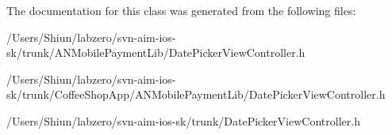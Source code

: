 The documentation for this class was generated from the following files:\begin{DoxyCompactItemize}
\item 
/Users/Shiun/labzero/svn-\/aim-\/ios-\/sk/trunk/ANMobilePaymentLib/DatePickerViewController.h\item 
/Users/Shiun/labzero/svn-\/aim-\/ios-\/sk/trunk/CoffeeShopApp/ANMobilePaymentLib/DatePickerViewController.h\item 
/Users/Shiun/labzero/svn-\/aim-\/ios-\/sk/trunk/DatePickerViewController.h\end{DoxyCompactItemize}
